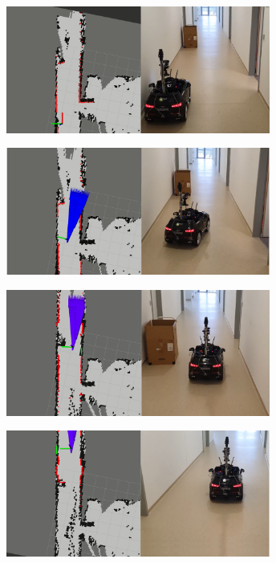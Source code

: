 \begin{minipage}{\textwidth}
	\centering
	\includegraphics[width=0.65\textwidth]{figures/raw/local_planner_real_test_joined_straight_traj_1_static_obj_1.png}
	
	\vspace{0.5cm}
	\centering
	\includegraphics[width=0.65\textwidth]{figures/raw/local_planner_real_test_joined_straight_traj_1_static_obj_2.png}
	
	\vspace{0.5cm}
	\centering
	\includegraphics[width=0.65\textwidth]{figures/raw/local_planner_real_test_joined_straight_traj_1_static_obj_3.png}
	
	\vspace{0.5cm}
	\centering
	\includegraphics[width=0.65\textwidth]{figures/raw/local_planner_real_test_joined_straight_traj_1_static_obj_4.png}
	
	\label{local_planner_real_test_joined_straight_traj_1_static_obj}
\end{minipage}

